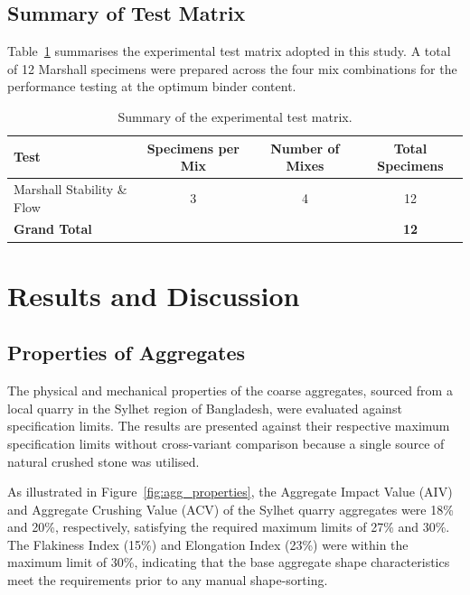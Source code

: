 \documentclass[12pt,a4paper]{article}
\begin{document}
\subsection{Summary of Test Matrix}

Table~\ref{tab:test_matrix} summarises the experimental test matrix adopted in this study. A total of 12 Marshall specimens were prepared across the four mix combinations for the performance testing at the optimum binder content.

\begin{table}[htbp]
    \centering
    \caption{Summary of the experimental test matrix.}
    \label{tab:test_matrix}
    \begin{tabular}{@{}lccc@{}}
        \toprule
        \textbf{Test} & \textbf{Specimens per Mix} & \textbf{Number of Mixes} & \textbf{Total Specimens} \\
        \midrule
        Marshall Stability \& Flow & 3 & 4 & 12 \\
        \midrule
        \textbf{Grand Total} & & & \textbf{12} \\
        \bottomrule
    \end{tabular}
\end{table}


\section{Results and Discussion}

\subsection{Properties of Aggregates}

The physical and mechanical properties of the coarse aggregates, sourced from a local quarry in the Sylhet region of Bangladesh, were evaluated against specification limits. The results are presented against their respective maximum specification limits without cross-variant comparison because a single source of natural crushed stone was utilised. 

As illustrated in Figure~\ref{fig:agg_properties}, the Aggregate Impact Value (AIV) and Aggregate Crushing Value (ACV) of the Sylhet quarry aggregates were 18\% and 20\%, respectively, satisfying the required maximum limits of 27\% and 30\%. The Flakiness Index (15\%) and Elongation Index (23\%) were within the maximum limit of 30\%, indicating that the base aggregate shape characteristics meet the requirements prior to any manual shape-sorting.
\end{document}
